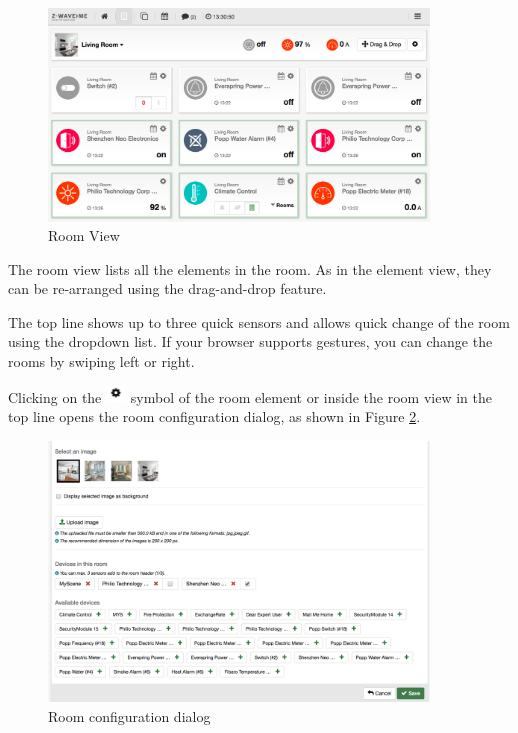 \begin{figure}
\begin{center}
\includegraphics[width=0.9\textwidth]{pngs/cap4/roomview.png}
\caption{Room View}
\label{roomview}
\end{center}
\end{figure}

The room view lists all the elements in the room. As in the element view, they can be 
re-arranged using the drag-and-drop feature.

The top line shows up to three quick sensors and allows quick change of the room using 
the dropdown list. If your browser supports gestures, you can change the rooms by 
swiping left or right.

Clicking on the \includegraphics[width=0.04\textwidth]{pngs/wheel.png} symbol of the 
room element or inside the room view in the top line opens the room configuration 
dialog, as shown in Figure \ref{sh7}.

\begin{figure}
\begin{center}
\includegraphics[width=0.9\textwidth]{pngs/cap4/sh7.png}
\caption{Room configuration dialog}
\label{sh7}
\end{center}
\end{figure}

